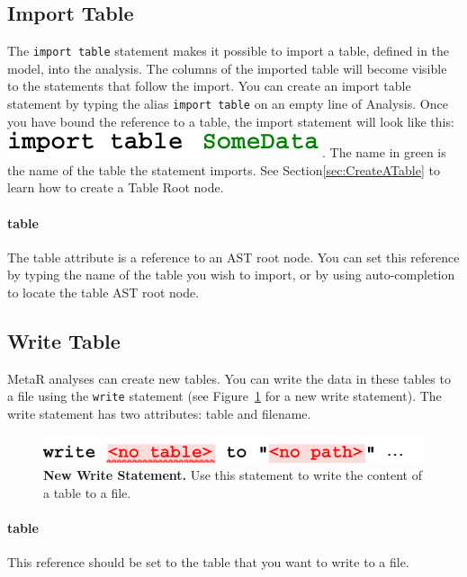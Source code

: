 \subsection{Import Table}
The \texttt{import table} statement makes it possible to import a table, defined in the model, into the analysis. The columns of the imported table will become visible to the statements that follow the import. You can create an import table statement by typing the alias \texttt{import table} on an empty line of Analysis. Once you have bound the reference to a table, the import statement will look like this: \includegraphics[height=2ex]{figures/SomeDataImportTable.pdf}. The name in green is the name of the table the statement imports. See Section\ref{sec:CreateATable} to learn how to create a Table Root node.
\paragraph{table}

The table attribute is a reference to an AST root node. You can set this reference by typing the name of the table you wish to import, or by using auto-completion \keys{\ctrl+\space} to locate the table AST root node.

\subsection{Write Table}
MetaR analyses can create new tables. You can write the data in these tables to a file using the \texttt{write} statement (see Figure~\ref{fig:NewWriteTableStatement} for a new write statement). The write statement has two attributes: table and filename.
\begin{figure}
  \centering
  \includegraphics[width=\figWidthNarrow]{figures/NewWriteStatement.pdf}
\caption[New Write Statement	.]{\textbf{New Write Statement.} Use this statement to write the content of a table to a file.}
\label{fig:NewWriteTableStatement}
\end{figure}


\paragraph{table}
This reference should be set to the table that you want to write to a file.
